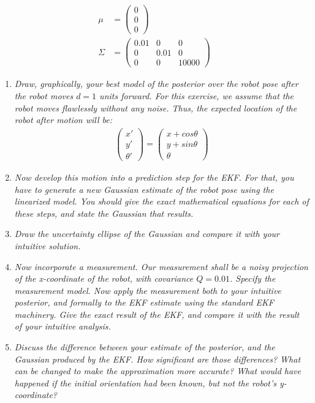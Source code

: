 \documentclass[10pt]{article}
\begin{document}
\begin{enumerate}
    \begin{align}
    \mu &= \begin{pmatrix}0 \\ 0 \\ 0\end{pmatrix} \\
    \Sigma &= \begin{pmatrix}0.01 & 0 & 0\\ 0 & 0.01 & 0 \\ 0 & 0 & 10000\end{pmatrix}
    \end{align}
  
    \begin{enumerate}
        \item \textit{Draw, graphically, your best model of the posterior over
            the robot pose after the robot moves $d=1$ units forward. For this
            exercise, we assume that the robot moves flawlessly without any noise.
            Thus, the expected location of the robot after motion will be:}
          \begin{align}
          \begin{pmatrix}x' \\ y' \\ \theta'\end{pmatrix} = 
          \begin{pmatrix}x+cos \theta \\ y + sin \theta \\ \theta\end{pmatrix}
          \end{align}
        \item \textit{Now develop this motion into a prediction step for the
            EKF. For that, you have to generate a new Gaussian estimate of the
            robot pose using the linearized model. You should give the exact
            mathematical equations for each of these steps, and state the Gaussian
            that results.}
          \item \textit{Draw the uncertainty ellipse of the Gaussian and
            compare it with your intuitive solution.}
          \item \textit{Now incorporate a measurement. Our measurement shall be
            a noisy projection of the x-coordinate of the robot, with covariance
            $Q=0.01$. Specify the measurement model. Now apply the measurement
            both to your intuitive posterior, and formally to the EKF estimate using
            the standard EKF machinery. Give the exact result of the EKF, and compare
            it with the result of your intuitive analysis.}
          \item \textit{Discuss the difference between your estimate of the
            posterior, and the Gaussian produced by the EKF. How significant
            are those differences? What can be changed to make the approximation
            more accurate? What would have happened if the initial orientation had
            been known, but not the robot's y-coordinate?}
    \end{enumerate}


\end{enumerate}
\end{document}
